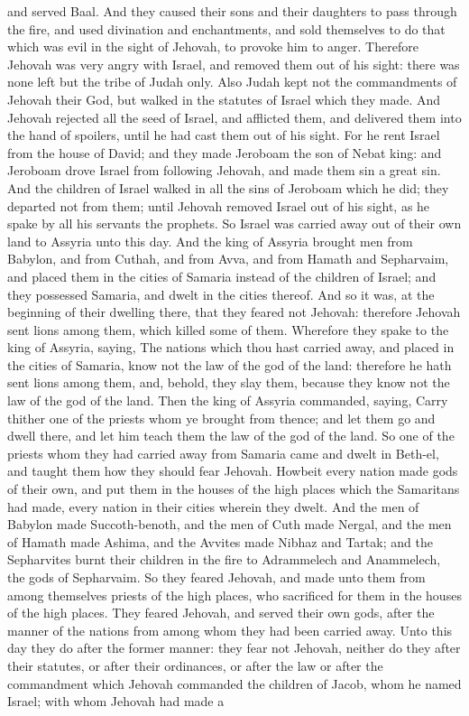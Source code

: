 and served Baal. And they caused their sons and their daughters to pass through the fire, and used divination and enchantments, and sold themselves to do that which was evil in the sight of Jehovah, to provoke him to anger. Therefore Jehovah was very angry with Israel, and removed them out of his sight: there was none left but the tribe of Judah only.  Also Judah kept not the commandments of Jehovah their God, but walked in the statutes of Israel which they made. And Jehovah rejected all the seed of Israel, and afflicted them, and delivered them into the hand of spoilers, until he had cast them out of his sight. For he rent Israel from the house of David; and they made Jeroboam the son of Nebat king: and Jeroboam drove Israel from following Jehovah, and made them sin a great sin. And the children of Israel walked in all the sins of Jeroboam which he did; they departed not from them; until Jehovah removed Israel out of his sight, as he spake by all his servants the prophets. So Israel was carried away out of their own land to Assyria unto this day.  And the king of Assyria brought men from Babylon, and from Cuthah, and from Avva, and from Hamath and Sepharvaim, and placed them in the cities of Samaria instead of the children of Israel; and they possessed Samaria, and dwelt in the cities thereof. And so it was, at the beginning of their dwelling there, that they feared not Jehovah: therefore Jehovah sent lions among them, which killed some of them. Wherefore they spake to the king of Assyria, saying, The nations which thou hast carried away, and placed in the cities of Samaria, know not the law of the god of the land: therefore he hath sent lions among them, and, behold, they slay them, because they know not the law of the god of the land.  Then the king of Assyria commanded, saying, Carry thither one of the priests whom ye brought from thence; and let them go and dwell there, and let him teach them the law of the god of the land. So one of the priests whom they had carried away from Samaria came and dwelt in Beth-el, and taught them how they should fear Jehovah. Howbeit every nation made gods of their own, and put them in the houses of the high places which the Samaritans had made, every nation in their cities wherein they dwelt. And the men of Babylon made Succoth-benoth, and the men of Cuth made Nergal, and the men of Hamath made Ashima, and the Avvites made Nibhaz and Tartak; and the Sepharvites burnt their children in the fire to Adrammelech and Anammelech, the gods of Sepharvaim. So they feared Jehovah, and made unto them from among themselves priests of the high places, who sacrificed for them in the houses of the high places. They feared Jehovah, and served their own gods, after the manner of the nations from among whom they had been carried away.  Unto this day they do after the former manner: they fear not Jehovah, neither do they after their statutes, or after their ordinances, or after the law or after the commandment which Jehovah commanded the children of Jacob, whom he named Israel; with whom Jehovah had made a 
